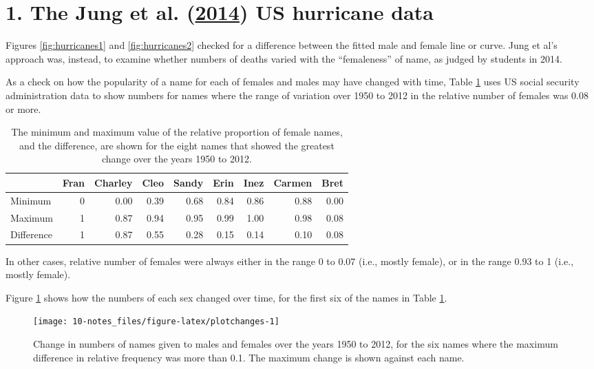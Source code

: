\documentclass[
  10ptls,
  b5paper]{book}
\begin{document}
\hypertarget{hurricanes}{%
\section*{\texorpdfstring{1. The Jung et al. (\protect\hyperlink{ref-jung2014female}{2014}) US hurricane data}{1. The Jung et al. (2014) US hurricane data}}\label{hurricanes}}

Figures \ref{fig:hurricanes1} and \ref{fig:hurricanes2} checked for a difference between the fitted male and female line or curve. Jung et al's approach was, instead, to examine whether numbers of deaths varied with the ``femaleness'' of name, as judged by students in 2014.

As a check on how the popularity of a name for each of females and males may have changed with time, Table \ref{tab:changetab} uses US social security administration data to show numbers for names where the range of variation over 1950 to 2012 in the relative number of females was 0.08 or more.

\begin{table}

\caption{\label{tab:changetab}The minimum and maximum value of the relative proportion
of female names, and the difference, are shown for the eight names
that showed the greatest change over the years 1950 to 2012.}
\centering
\begin{tabular}[t]{l|r|r|r|r|r|r|r|r}
\hline
  & Fran & Charley & Cleo & Sandy & Erin & Inez & Carmen & Bret\\
\hline
Minimum & 0 & 0.00 & 0.39 & 0.68 & 0.84 & 0.86 & 0.88 & 0.00\\
\hline
Maximum & 1 & 0.87 & 0.94 & 0.95 & 0.99 & 1.00 & 0.98 & 0.08\\
\hline
Difference & 1 & 0.87 & 0.55 & 0.28 & 0.15 & 0.14 & 0.10 & 0.08\\
\hline
\end{tabular}
\end{table}

In other cases, relative number of females were always either in the range 0 to 0.07 (i.e., mostly female), or in the range 0.93 to 1 (i.e., mostly female).

Figure \ref{fig:plotchanges} shows how the numbers of each sex changed over time, for the first six of the names in Table \ref{tab:changetab}.

\begin{figure}

{\centering \texttt{[image: 10-notes\_files/figure-latex/plotchanges-1]} 

}

\caption{Change in numbers of names given to males and females
over the years 1950 to 2012, for the six names where the 
maximum difference in relative frequency was more than 0.1.
The maximum change is shown against each name.}\label{fig:plotchanges}
\end{figure}
\end{document}
